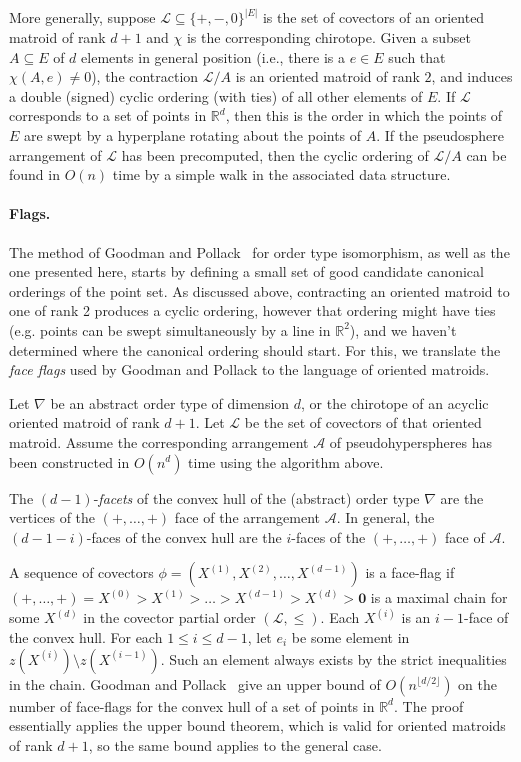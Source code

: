 \documentclass[leqno,12pt]{article}
\def\R{\mathbb{R}}
\def\L{\mathcal{L}}
\def\A{\mathcal{A}}
\def\orig{\mathbf{0}}
\begin{document}
More generally, suppose $\L\subseteq \{+,-,0\}^{|E|}$ is the set of covectors
of an oriented matroid of rank $d+1$ and $\chi$ is the corresponding
chirotope.
Given a subset $A\subseteq E$ of 
$d$ elements in general position
(i.e., there is a $e\in E$ such that $\chi(A,e)\neq 0$),
the contraction $\L/ A$ is an oriented matroid of rank $2$, and
induces a double (signed) cyclic ordering (with ties) of all other elements of
$E$. If $\L$ corresponds to a set of points in $\R^d$, then this is
the order in which the points of $E$ are  swept by a hyperplane
rotating about the points of $A$.   If the pseudosphere
arrangement of $\L$ has been precomputed, then the cyclic ordering of
$\L/A$ can be found in $O(n)$ time by a simple walk in the
associated data structure.   \\

\paragraph{Flags.}
The method of Goodman and Pollack~\cite{goodman_pollack_83_sorting} for order type isomorphism, as well
as the one presented here, starts by defining a small set of good
candidate canonical orderings of the point set.
As discussed above, contracting an oriented matroid to one of rank 2
produces a cyclic ordering, however that ordering might have ties
(e.g. points can be swept simultaneously by a line in $\R^2$), and
we haven't determined where the canonical ordering should start.
For this, we translate the \emph{face flags} used by Goodman and Pollack to
the language of oriented matroids.

Let $\nabla$ be an abstract order type of dimension $d$, or the
chirotope of an acyclic oriented matroid of rank
$d{+}1$. Let $\L$ be the set of covectors of that 
oriented 
matroid.
Assume the corresponding arrangement $\A$ of pseudohyperspheres has
been constructed in  $O(n^d)$ time using the algorithm above.

The $(d{-}1)$-{\em facets} of the convex hull of the (abstract)
order type $\nabla$ are the vertices of the $(+,\ldots,+)$ face of the
arrangement $\A$.
In general, the $(d{-}1{-}i)$-faces of the convex hull are the $i$-faces
of the $(+,\ldots,+)$ face of $\A$.

A sequence of covectors $\phi = (X^{(1)},X^{(2)},\ldots,X^{(d-1)})$ is a
face-flag if $(+,\ldots,+)=X^{(0)}>X^{(1)}>\ldots>X^{(d-1)}>X^{(d)}>\orig$
is a maximal chain for some $X^{(d)}$ 
in the covector partial order $(\L,\leq)$.
Each $X^{(i)}$ is an $i{-}1$-face of the convex hull.  
For each $1\leq i\leq d-1$, let $e_i$ be some element in
$z(X^{(i)})\setminus z(X^{(i-1)})$. Such an element always exists by
the strict inequalities in the chain.
Goodman and Pollack~\cite{goodman_pollack_83_sorting} give an upper bound of
$O(n^{\lfloor d/2\rfloor})$ on the number of face-flags for the convex
hull of a set of points in $\R^d$. The proof essentially applies the
upper bound theorem, which is valid for oriented matroids of rank
$d{+}1$, so the same bound applies to the general case.
\end{document}
